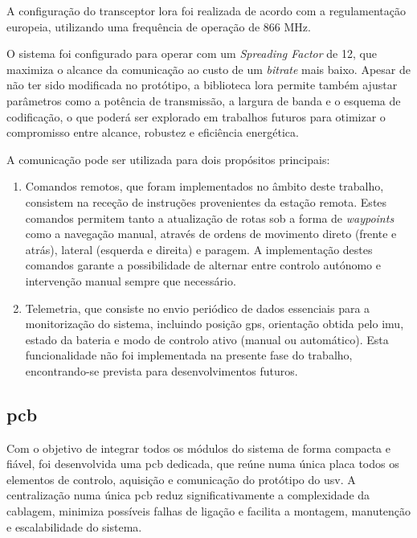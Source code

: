 A configuração do transceptor \gls{lora} foi realizada de acordo com a regulamentação europeia, utilizando uma frequência de operação de 866 MHz. 

O sistema foi configurado para operar com um \emph{Spreading Factor} de 12, que maximiza o alcance da comunicação ao custo de um \emph{bitrate} mais baixo. Apesar de não ter sido modificada no protótipo, a biblioteca \gls{lora} permite também ajustar parâmetros como a potência de transmissão, a largura de banda e o esquema de codificação, o que poderá ser explorado em trabalhos futuros para otimizar o compromisso entre alcance, robustez e eficiência energética.  

A comunicação pode ser utilizada para dois propósitos principais:  

\begin{enumerate}
    \item Comandos remotos, que foram implementados no âmbito deste trabalho, consistem na receção de instruções provenientes da estação remota. Estes comandos permitem tanto a atualização de rotas sob a forma de \emph{waypoints} como a navegação manual, através de ordens de movimento direto (frente e atrás), lateral (esquerda e direita) e paragem. A implementação destes comandos garante a possibilidade de alternar entre controlo autónomo e intervenção manual sempre que necessário.  
    \item Telemetria, que consiste no envio periódico de dados essenciais para a monitorização do sistema, incluindo posição \gls{gps}, orientação obtida pelo \gls{imu}, estado da bateria e modo de controlo ativo (manual ou automático). Esta funcionalidade não foi implementada na presente fase do trabalho, encontrando-se prevista para desenvolvimentos futuros.  
\end{enumerate}

\subsection{\acrfull{pcb}}
\label{subsec:pcb}

Com o objetivo de integrar todos os módulos do sistema de forma compacta e fiável, foi desenvolvida uma \gls{pcb} dedicada, que reúne numa única placa todos os elementos de controlo, aquisição e comunicação do protótipo do \gls{usv}. A centralização numa única \gls{pcb} reduz significativamente a complexidade da cablagem, minimiza possíveis falhas de ligação e facilita a montagem, manutenção e escalabilidade do sistema.  

